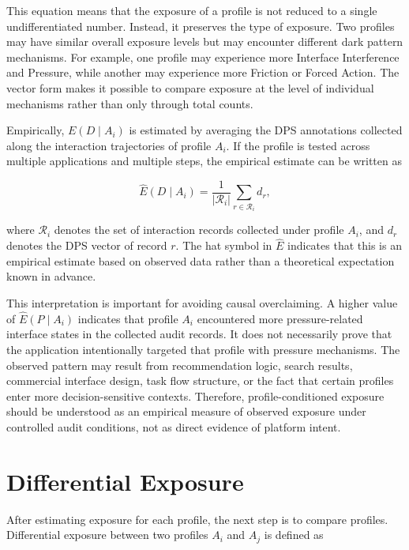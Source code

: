 This equation means that the exposure of a profile is not reduced to a single undifferentiated number. Instead, it preserves the type of exposure. Two profiles may have similar overall exposure levels but may encounter different dark pattern mechanisms. For example, one profile may experience more Interface Interference and Pressure, while another may experience more Friction or Forced Action. The vector form makes it possible to compare exposure at the level of individual mechanisms rather than only through total counts.

Empirically, $E(D \mid A_i)$ is estimated by averaging the DPS annotations collected along the interaction trajectories of profile $A_i$. If the profile is tested across multiple applications and multiple steps, the empirical estimate can be written as

\begin{equation}
\widehat{E}(D \mid A_i)
=
\frac{1}{|\mathcal{R}_i|}
\sum_{r \in \mathcal{R}_i} d_r,
\label{eq:empirical-conditional-exposure}
\end{equation}

where $\mathcal{R}_i$ denotes the set of interaction records collected under profile $A_i$, and $d_r$ denotes the DPS vector of record $r$. The hat symbol in $\widehat{E}$ indicates that this is an empirical estimate based on observed data rather than a theoretical expectation known in advance.

This interpretation is important for avoiding causal overclaiming. A higher value of $\widehat{E}(P \mid A_i)$ indicates that profile $A_i$ encountered more pressure-related interface states in the collected audit records. It does not necessarily prove that the application intentionally targeted that profile with pressure mechanisms. The observed pattern may result from recommendation logic, search results, commercial interface design, task flow structure, or the fact that certain profiles enter more decision-sensitive contexts. Therefore, profile-conditioned exposure should be understood as an empirical measure of observed exposure under controlled audit conditions, not as direct evidence of platform intent.

\section{Differential Exposure}
\label{subsec:differential-exposure}

After estimating exposure for each profile, the next step is to compare profiles. Differential exposure between two profiles $A_i$ and $A_j$ is defined as

